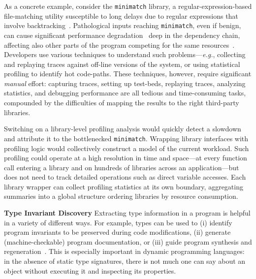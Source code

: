 \documentclass[letterpaper,twocolumn,10pt]{article}
\def\eg{{\em e.g.}, }
\newcommand{\heading}[1]{\vspace{2pt}\noindent\textbf{#1}\enspace}
\newcommand{\ttt}[1]{\texttt{#1}}
\newcommand{\fixme}[1]{{\color{red}#1}}
\begin{document}
As a concrete example, consider the \ttt{minimatch} library, a regular-expression-based file-matching utility susceptible to long delays due to regular expressions that involve backtracking~\cite{minimatch}.
Pathological inputs reaching \ttt{minimatch}, even if benign, can cause significant performance degradation~\cite{redos} deep in the dependency chain, affecting also other parts of the program competing for the same resources~\cite{evp}.
Developers use various techniques to understand such problems---\eg collecting and replaying traces against off-line versions of the system, or using statistical profiling to identify hot code-paths.
These techniques, however, require significant \emph{manual} effort:
  capturing traces, setting up test-beds, replaying traces, analyzing statistics, and debugging performance are all tedious and time-consuming tasks, compounded by the difficulties of mapping the results to the right third-party libraries.

Switching on a library-level profiling analysis %
  would quickly detect a slowdown and attribute it to the bottlenecked \ttt{minimatch}.
Wrapping library interfaces with profiling logic would collectively construct a model of the current workload.
Such profiling could operate at a high resolution in time and space---at every function call entering a library and on hundreds of libraries across an application---but does not need to track detailed operations such as direct variable accesses.
Each library wrapper can collect profiling statistics at its own boundary, aggregating summaries into a global structure ordering libraries by resource consumption.



\heading{Type Invariant Discovery}
Extracting type information in a program is helpful in a variety of different ways. %
For example, types can be used to (i) identify program invariants to be preserved during code modifications, (ii) generate (machine-checkable) program documentation, or (iii) guide program synthesis and regeneration~\cite{daikon}.
This is especially important in dynamic programming languages:
  in the absence of static type signatures, there is not much one can say about an object without executing it and inspecting its properties.
\end{document}
